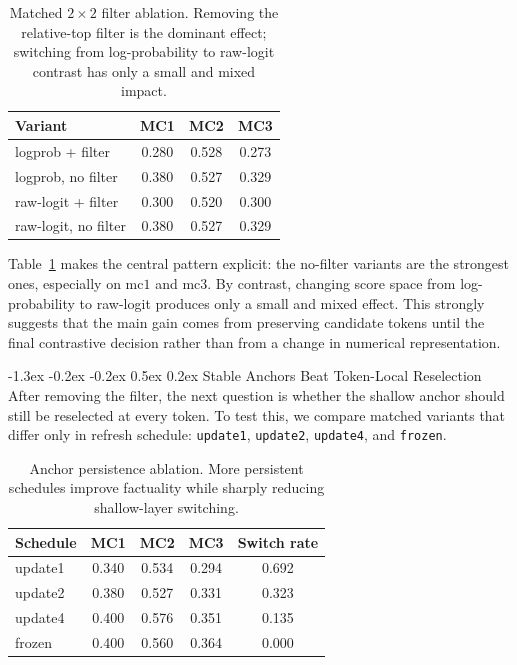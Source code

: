 \documentclass[10pt,twocolumn]{article}
\makeatletter
\renewcommand\subsection{\@startsection{subsection}{2}{\z@}%
  {-1.3ex \@plus -0.2ex \@minus -0.2ex}%
  {0.5ex \@plus 0.2ex}%
  {\normalsize\bfseries}}
\makeatother
\begin{document}
\begin{table}[!t]
    \centering
    \small
    \begin{tabular}{lccc}
        \toprule
        Variant & MC1 & MC2 & MC3 \\
        \midrule
        logprob + filter & 0.280 & 0.528 & 0.273 \\
        logprob, no filter & 0.380 & 0.527 & 0.329 \\
        raw-logit + filter & 0.300 & 0.520 & 0.300 \\
        raw-logit, no filter & 0.380 & 0.527 & 0.329 \\
        \bottomrule
    \end{tabular}
    \caption{Matched $2 \times 2$ filter ablation. Removing the relative-top filter is the dominant effect; switching from log-probability to raw-logit contrast has only a small and mixed impact.}
    \label{tab:filter-ablation}
\end{table}

Table~\ref{tab:filter-ablation} makes the central pattern explicit: the no-filter variants are the strongest ones, especially on $\mathrm{mc1}$ and $\mathrm{mc3}$. By contrast, changing score space from log-probability to raw-logit produces only a small and mixed effect. This strongly suggests that the main gain comes from preserving candidate tokens until the final contrastive decision rather than from a change in numerical representation.

\subsection{Stable Anchors Beat Token-Local Reselection}
After removing the filter, the next question is whether the shallow anchor should still be reselected at every token. To test this, we compare matched variants that differ only in refresh schedule: \texttt{update1}, \texttt{update2}, \texttt{update4}, and \texttt{frozen}.

\begin{table}[!t]
    \centering
    \small
    \begin{tabular}{lcccc}
        \toprule
        Schedule & MC1 & MC2 & MC3 & Switch rate \\
        \midrule
        update1 & 0.340 & 0.534 & 0.294 & 0.692 \\
        update2 & 0.380 & 0.527 & 0.331 & 0.323 \\
        update4 & 0.400 & 0.576 & 0.351 & 0.135 \\
        frozen & 0.400 & 0.560 & 0.364 & 0.000 \\
        \bottomrule
    \end{tabular}
    \caption{Anchor persistence ablation. More persistent schedules improve factuality while sharply reducing shallow-layer switching.}
    \label{tab:persistence}
\end{table}
\end{document}
